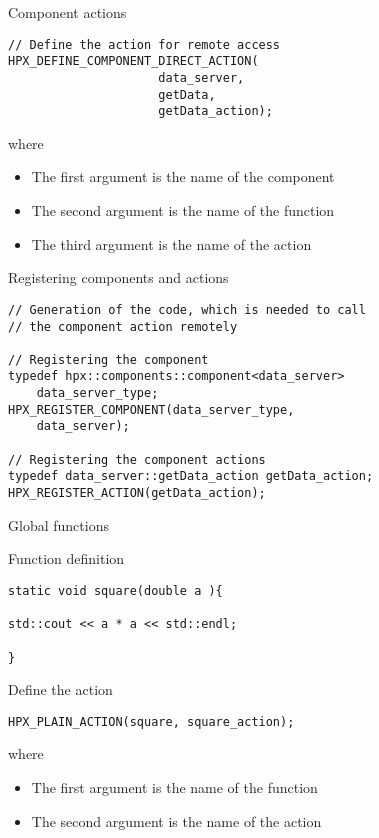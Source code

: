 \documentclass[12pt,t]{beamer}
\begin{document}
\begin{frame}[fragile]{Component actions}

\begin{lstlisting}
// Define the action for remote access
HPX_DEFINE_COMPONENT_DIRECT_ACTION(
                     data_server,
                     getData,
                     getData_action);
\end{lstlisting}
where
\begin{itemize}
\item The first argument is the name of the component
\item The second argument is the name of the function
\item The third argument is the name of the action
\end{itemize}
\end{frame}

\begin{frame}[fragile]{Registering components and actions}

\begin{lstlisting}
// Generation of the code, which is needed to call 
// the component action remotely

// Registering the component
typedef hpx::components::component<data_server> 
    data_server_type;
HPX_REGISTER_COMPONENT(data_server_type, 
    data_server);
    
// Registering the component actions
typedef data_server::getData_action getData_action;
HPX_REGISTER_ACTION(getData_action);
\end{lstlisting}

\end{frame}



\begin{frame}[fragile]{Global functions}

\begin{block}{Function definition}
\begin{lstlisting}
static void square(double a ){

std::cout << a * a << std::endl;

}
\end{lstlisting}
\end{block}

\begin{block}{Define the action}
\begin{lstlisting}
HPX_PLAIN_ACTION(square, square_action);
\end{lstlisting}
where
\begin{itemize}
\item The first argument is the name of the function
\item The second argument is the name of the action
\end{itemize}

\end{block}
\end{frame}
\end{document}
